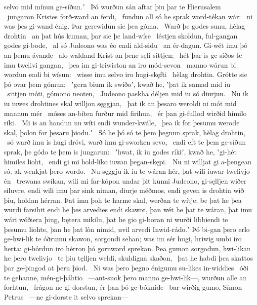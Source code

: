 selvo mid mínun ge-síðun.ʼ \hld\ Þó wurðun sán aftar þiu
þar te Hierusalem \hld\ jungaron Kristes
forð-ward an ferdi, \hld\ fundun all só he sprak
word-tékạn wár: \hld\ ni was þes gi-wand énig.
Þar gerewidun sie þea góma. \hld\ Warð þe godes sunu,
hèlag drohtin \hld\ an þat hús kuman,
þar sie þe land-wíse \hld\ léstjen skoldun,
ful-gangan godes gi-bode, \hld\ al só Judeono was
éo endi ald-sidu \hld\ an ér-dagun.
Gi-wét imu þó an þemu ávande \hld\ alo-waldand Krist
an þene sęli sittjen; \hld\ hét þar is ge-síðos te imu
twelivi gangan, \hld\ þea im gi-triwiston
an iro mód-sevon \hld\ manno wárun
bi wordun endi bi wísun: \hld\ wisse imu selvo
iro hugi-skęfti \hld\ hèlag drohtin.
Grótte sie þó ovar þem gómun: \hld\ ʽgern bium ik swíðoʼ, kwað he,
ʽþat ik samad mid iu \hld\ sittjen móti,
gómono neoten, \hld\ Judeono paskha
déljen mid iu só diurjun. \hld\ Nu ik iu iuwes drohtines skal
willjon sęggjan, \hld\ þat ik an þesaro weroldi ni mót
mid mannun mér \hld\ móses an-bíten
furður mid firihun, \hld\ ér þan gi-fullod wirðid
himilo ríki. \hld\ Mi is an handun nu
wíti endi wunder-kwále, \hld\ þea ik for þesumu werode skal,
þolon for þesaru þiodu.ʼ \hld\ Só he þó só te þem þegnun sprak,
hèlag drohtin, \hld\ só warð imu is hugi dróvi,
warð imu gi-sworken sevo, \hld\ endi eft te þem ge-síðun sprak,
þe gódo te þem is jungarun: \hld\ ʽhwat, ik iu godes ríkiʼ, kwað he,
ʽgi-hét himiles lioht, \hld\ endi gi mi hold-líko
iuwan þegan-skępi. \hld\ Nu ni willjat gi a-þengean só,
ak wenkjat þero wordo. \hld\ Nu sęggju ik iu te wáran hér,
þat wili iuwar twelivjo én \hld\ trewana swíkan,
wili mi far-kópon undar þit kunni Judeono,
gi-sęlljen wiðer siluvre, endi wili imu þar sink niman,
diurje méðmos, endi geven is drohtin wið þiu,
holdan hérran. Þat imu þoh te harme skal,
werðan te wítje; be þat he þea wurdi farsihit
endi he þes arvedies endi skawot,
þan wét he þat te wáran, þat imu wári wóðiera þing,
bętera mikilu, þat he gio gi-boran ni wurði
libbiendi te þesumu liohte, þan he þat lòn nimid,
uvil arvedi Inwid-rádo.ʼ
Þó bi-gan þero erlo ge-hwi-lik te óðrumu skawon,
sorgondi sehan; was im sér hugi,
hriwig umbi iro herta: gi-hórdun iro hérron þó
gornword sprekan. Þea gumon sorgodun,
hwi-likan he þero twelivjo \hld\ te þiu tęlljen weldi,
skuldigna skaðon, \hld\ þat he habdi þea skattos þar
ge-þingod at þeru þiod. \hld\ Ni was þero þegno énigumu
su-likes in-widdies \hld\ óði te gehanne,
mén-gi-þáhtio \hld\ —ant-suok þero manno ge-hwi-lik—,
wurðun alle an forhtun, \hld\ frágon ne gi-dorstun,
ér þan þó ge-bóknide \hld\ bar-wirðig gumo,
Símon Petrus \hld\ —ne gi-dorste it selvo sprekan—

